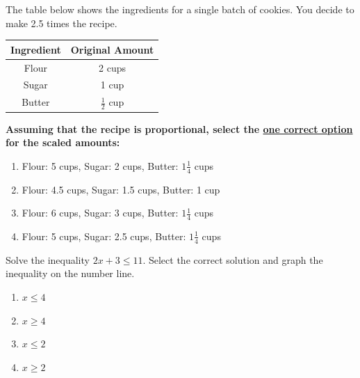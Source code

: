 \documentclass[12pt]{article}
\begin{document}
\begin{tcolorbox}[colframe=black!50, colback=white, title=\textbf{Problem 9 (7.RP.A.3)}]
The table below shows the ingredients for a single batch of cookies. You decide to make 2.5 times the recipe. 

\begin{center}
\begin{tabular}{|c|c|}
\hline
\textbf{Ingredient} & \textbf{Original Amount} \\
\hline
Flour & 2 cups \\
\hline
Sugar & 1 cup \\
\hline
Butter & \(\frac{1}{2}\) cup \\
\hline
\end{tabular}
\end{center}

\textbf{Assuming that the recipe is proportional, select the \underline{one correct option} for the scaled amounts:}
\begin{enumerate}[label=(\Alph*)]
    \item Flour: 5 cups, Sugar: 2 cups, Butter: \(1\frac{1}{4}\) cups
    \item Flour: 4.5 cups, Sugar: 1.5 cups, Butter: 1 cup
    \item Flour: 6 cups, Sugar: 3 cups, Butter: \(1\frac{1}{4}\) cups
    \item Flour: 5 cups, Sugar: 2.5 cups, Butter: \(1\frac{1}{4}\) cups
\end{enumerate}

\vspace{2cm}

\end{tcolorbox}

\begin{tcolorbox}[colframe=black!50, colback=white, title=\textbf{Problem 10 (7.EE.B.4)}]
Solve the inequality \(2x + 3 \leq 11\). Select the correct solution and graph the inequality on the number line.\\

\begin{enumerate}[label=(\Alph*)]
    \item \(x \leq 4\)
    \item \(x \geq 4\)
    \item \(x \leq 2\)
    \item \(x \geq 2\)
\end{enumerate}

\begin{center}
\end{center}

\vspace{2cm}
\end{tcolorbox}
\end{document}
